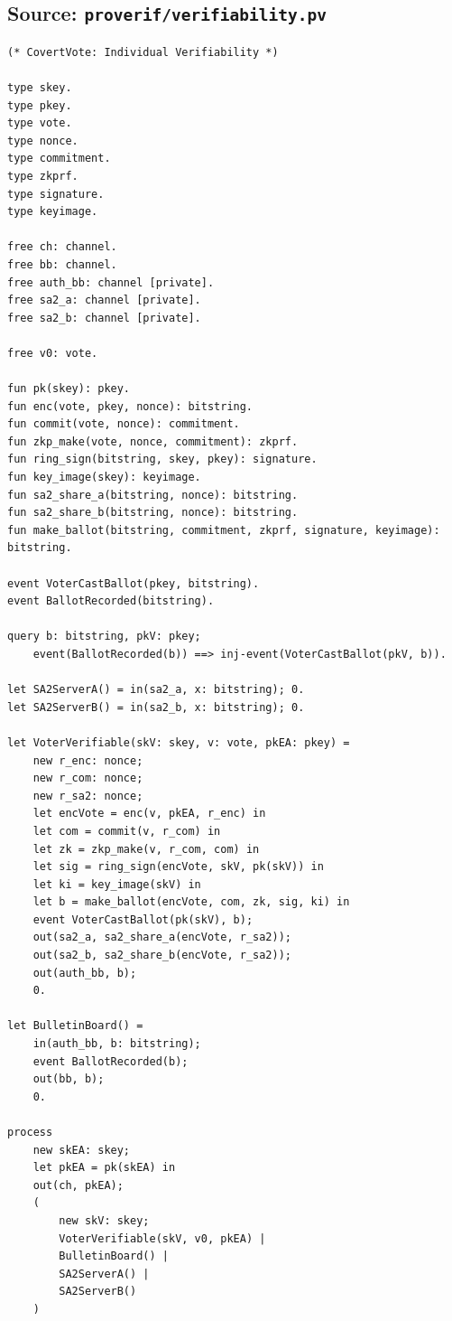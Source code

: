 \subsection*{Source: \texttt{proverif/verifiability.pv}}
\begin{footnotesize}
\begin{verbatim}
(* CovertVote: Individual Verifiability *)

type skey.
type pkey.
type vote.
type nonce.
type commitment.
type zkprf.
type signature.
type keyimage.

free ch: channel.
free bb: channel.
free auth_bb: channel [private].
free sa2_a: channel [private].
free sa2_b: channel [private].

free v0: vote.

fun pk(skey): pkey.
fun enc(vote, pkey, nonce): bitstring.
fun commit(vote, nonce): commitment.
fun zkp_make(vote, nonce, commitment): zkprf.
fun ring_sign(bitstring, skey, pkey): signature.
fun key_image(skey): keyimage.
fun sa2_share_a(bitstring, nonce): bitstring.
fun sa2_share_b(bitstring, nonce): bitstring.
fun make_ballot(bitstring, commitment, zkprf, signature, keyimage): bitstring.

event VoterCastBallot(pkey, bitstring).
event BallotRecorded(bitstring).

query b: bitstring, pkV: pkey;
    event(BallotRecorded(b)) ==> inj-event(VoterCastBallot(pkV, b)).

let SA2ServerA() = in(sa2_a, x: bitstring); 0.
let SA2ServerB() = in(sa2_b, x: bitstring); 0.

let VoterVerifiable(skV: skey, v: vote, pkEA: pkey) =
    new r_enc: nonce;
    new r_com: nonce;
    new r_sa2: nonce;
    let encVote = enc(v, pkEA, r_enc) in
    let com = commit(v, r_com) in
    let zk = zkp_make(v, r_com, com) in
    let sig = ring_sign(encVote, skV, pk(skV)) in
    let ki = key_image(skV) in
    let b = make_ballot(encVote, com, zk, sig, ki) in
    event VoterCastBallot(pk(skV), b);
    out(sa2_a, sa2_share_a(encVote, r_sa2));
    out(sa2_b, sa2_share_b(encVote, r_sa2));
    out(auth_bb, b);
    0.

let BulletinBoard() =
    in(auth_bb, b: bitstring);
    event BallotRecorded(b);
    out(bb, b);
    0.

process
    new skEA: skey;
    let pkEA = pk(skEA) in
    out(ch, pkEA);
    (
        new skV: skey;
        VoterVerifiable(skV, v0, pkEA) |
        BulletinBoard() |
        SA2ServerA() |
        SA2ServerB()
    )
\end{verbatim}
\end{footnotesize}

